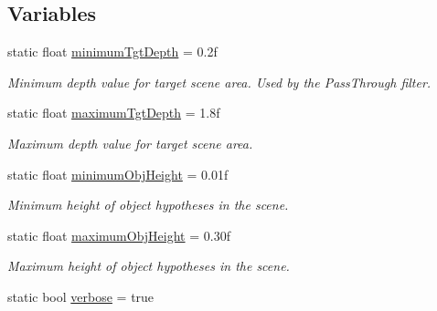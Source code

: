 \subsection*{Variables}
\begin{DoxyCompactItemize}
\item 
\hypertarget{namespaceope_acc118af7990b270118116b8f4f72e0bd}{static float \hyperlink{namespaceope_acc118af7990b270118116b8f4f72e0bd}{minimum\-Tgt\-Depth} = 0.\-2f}\label{namespaceope_acc118af7990b270118116b8f4f72e0bd}

\begin{DoxyCompactList}\small\item\em Minimum depth value for target scene area. Used by the {\ttfamily Pass\-Through} filter. \end{DoxyCompactList}\item 
\hypertarget{namespaceope_a8940b4c7eeae8e01e7a85edf154570f1}{static float \hyperlink{namespaceope_a8940b4c7eeae8e01e7a85edf154570f1}{maximum\-Tgt\-Depth} = 1.\-8f}\label{namespaceope_a8940b4c7eeae8e01e7a85edf154570f1}

\begin{DoxyCompactList}\small\item\em Maximum depth value for target scene area. \end{DoxyCompactList}\item 
\hypertarget{namespaceope_a59172f3f63dd942c89541b3f5800b3ab}{static float \hyperlink{namespaceope_a59172f3f63dd942c89541b3f5800b3ab}{minimum\-Obj\-Height} = 0.\-01f}\label{namespaceope_a59172f3f63dd942c89541b3f5800b3ab}

\begin{DoxyCompactList}\small\item\em Minimum height of object hypotheses in the scene. \end{DoxyCompactList}\item 
\hypertarget{namespaceope_aaa6d047c71f40cbb4168feada620f20c}{static float \hyperlink{namespaceope_aaa6d047c71f40cbb4168feada620f20c}{maximum\-Obj\-Height} = 0.\-30f}\label{namespaceope_aaa6d047c71f40cbb4168feada620f20c}

\begin{DoxyCompactList}\small\item\em Maximum height of object hypotheses in the scene. \end{DoxyCompactList}\item 
\hypertarget{namespaceope_a449dd60d5fb8fd54a7a2abeabf918ca7}{static bool \hyperlink{namespaceope_a449dd60d5fb8fd54a7a2abeabf918ca7}{verbose} = true}\label{namespaceope_a449dd60d5fb8fd54a7a2abeabf918ca7}


\end{DoxyCompactItemize}
